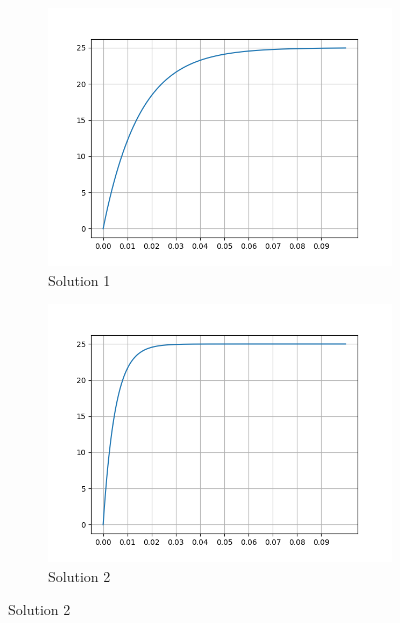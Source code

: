 \begin{figure}[ht!]
  \begin{subfigure}{0.45\textwidth}
    \begin{center}
	 \includegraphics[width=0.9\linewidth]{img/fig008a}
	\end{center}
    \caption{Solution 1} \label{fig008a}
  \end{subfigure}%
  \hspace*{\fill}   %
  \begin{subfigure}{0.45\textwidth}
    \begin{center}
	 \includegraphics[width=0.9\linewidth]{img/fig008b}
	\end{center}
    \caption{Solution 2} \label{fig008b}
  \end{subfigure}%
\end{figure}
  
